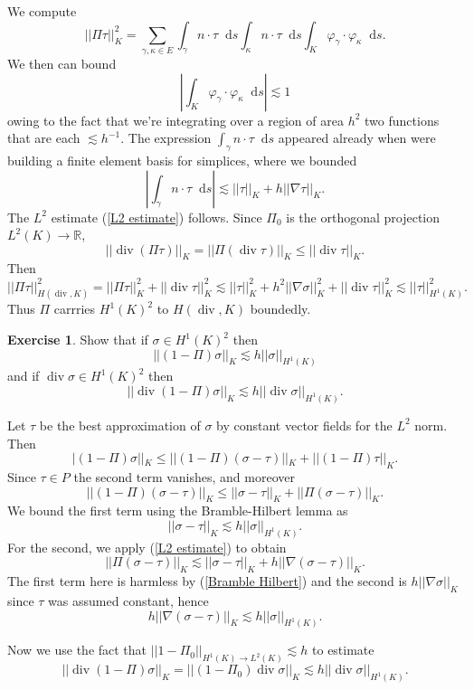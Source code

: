 \documentclass[10pt]{article}
\newcommand{\RR}{\mathbb{R}}
\newcommand*\dif{\mathop{}\!\mathrm{d}}
\DeclareMathOperator{\Div}{div}
\theoremstyle{definition}
\newtheorem{exer}{Exercise}
\begin{document}
    We compute 
    $$||\Pi \tau||_K^2 = \sum_{\gamma, \kappa \in E} \int_\gamma n \cdot \tau \dif s \int_\kappa n \cdot \tau \dif s \int_K \varphi_\gamma \cdot \varphi_\kappa \dif s.$$
    We then can bound 
    $$\left|\int_K \varphi_\gamma \cdot \varphi_\kappa \dif s\right| \lesssim 1$$
    owing to the fact that we're integrating over a region of area $h^2$ two functions that are each $\lesssim h^{-1}$. 
    The expression $\int_\gamma n \cdot \tau \dif s$ appeared already when were building a finite element basis for simplices, where we bounded 
    $$\left|\int_\gamma n \cdot \tau \dif s\right| \lesssim ||\tau||_K + h ||\nabla \tau||_K.$$
    The $L^2$ estimate (\ref{L2 estimate}) follows.
    Since $\Pi_0$ is the orthogonal projection $L^2(K) \to \RR$,
    $$||\Div(\Pi \tau)||_K = ||\Pi(\Div \tau)||_K \leq ||\Div \tau||_K.$$
    Then 
    $$||\Pi \tau||_{H(\Div, K)}^2 = ||\Pi \tau||_K^2 + ||\Div \tau||_K^2 \lesssim ||\tau||_K^2 + h^2 ||\nabla \sigma||_K^2 + ||\Div \tau||_K^2 \lesssim ||\tau||_{H^1(K)}^2.$$
    Thus $\Pi$ carrries $H^1(K)^2$ to $H(\Div, K)$ boundedly.

\begin{exer}
    Show that if $\sigma \in H^1(K)^2$ then 
    $$||(1 - \Pi)\sigma||_K \lesssim h ||\sigma||_{H^1(K)}$$
    and if $\Div \sigma \in H^1(K)^2$ then 
    $$||\Div(1 - \Pi)\sigma||_K \lesssim h ||\Div \sigma||_{H^1(K)}.$$
\end{exer}

    Let $\tau$ be the best approximation of $\sigma$ by constant vector fields for the $L^2$ norm. Then
    $$|(1 - \Pi)\sigma||_K \leq ||(1 - \Pi)(\sigma - \tau)||_K + ||(1 - \Pi) \tau||_K.$$
    Since $\tau \in P$ the second term vanishes, and moreover
    $$||(1 - \Pi)(\sigma - \tau)||_K \leq ||\sigma - \tau||_K + ||\Pi (\sigma - \tau)||_K.$$
    We bound the first term using the Bramble-Hilbert lemma as
\begin{equation}\label{Bramble Hilbert}
    ||\sigma - \tau||_K \lesssim h ||\sigma||_{H^1(K)}.
\end{equation}
    For the second, we apply (\ref{L2 estimate}) to obtain
    $$||\Pi (\sigma - \tau)||_K \lesssim ||\sigma - \tau||_K + h ||\nabla (\sigma - \tau)||_K.$$
    The first term here is harmless by (\ref{Bramble Hilbert}) and the second is $h ||\nabla \sigma||_K$ since $\tau$ was assumed constant, hence
    $$h ||\nabla (\sigma - \tau)||_K \lesssim h ||\sigma||_{H^1(K)}.$$

    Now we use the fact that $||1 - \Pi_0||_{H^1(K) \to L^2(K)} \lesssim h$ to estimate 
    $$||\Div(1 - \Pi)\sigma||_K = ||(1 - \Pi_0) \Div \sigma||_K \lesssim h ||\Div \sigma||_{H^1(K)}.$$
\end{document}
